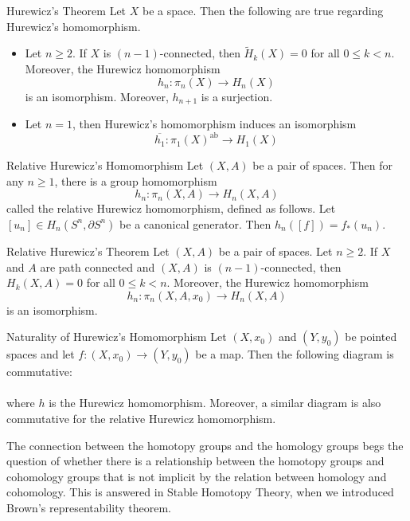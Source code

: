 \documentclass[a4paper]{article}
\begin{document}
\begin{thm}{Hurewicz's Theorem}{} Let $X$ be a space. Then the following are true regarding Hurewicz's homomorphism. 
\begin{itemize}
\item Let $n\geq 2$. If $X$ is $(n-1)$-connected, then $\widetilde{H}_k(X)=0$ for all $0\leq k<n$. Moreover, the Hurewicz homomorphism $$h_n:\pi_n(X)\to H_n(X)$$ is an isomorphism. Moreover, $h_{n+1}$ is a surjection. 
\item Let $n=1$, then Hurewicz's homomorphism induces an isomorphism $$\overline{h_1}:\pi_1(X)^\text{ab}\to H_1(X)$$ 
\end{itemize}
\end{thm}

\begin{thm}{Relative Hurewicz's Homomorphism}{} Let $(X,A)$ be a pair of spaces. Then for any $n\geq 1$, there is a group homomorphism $$h_n:\pi_n(X,A)\to H_n(X,A)$$ called the relative Hurewicz homomorphism, defined as follows. Let $[u_n]\in H_n(S^n,\partial S^n)$ be a canonical generator. Then $h_n([f])=f_\ast(u_n)$. 
\end{thm}

\begin{thm}{Relative Hurewicz's Theorem}{} Let $(X,A)$ be a pair of spaces. Let $n\geq 2$. If $X$ and $A$ are path connected and $(X,A)$ is $(n-1)$-connected, then $H_k(X,A)=0$ for all $0\leq k<n$. Moreover, the Hurewicz homomorphism $$h_n:\pi_n(X,A,x_0)\to H_n(X,A)$$ is an isomorphism. 
\end{thm}

\begin{thm}{Naturality of Hurewicz's Homomorphism}{} Let $(X,x_0)$ and $(Y,y_0)$ be pointed spaces and let $f:(X,x_0)\to(Y,y_0)$ be a map. Then the following diagram is commutative: \\
\\
where $h$ is the Hurewicz homomorphism. Moreover, a similar diagram is also commutative for the relative Hurewicz homomorphism. 
\end{thm}

The connection between the homotopy groups and the homology groups begs the question of whether there is a relationship between the homotopy groups and cohomology groups that is not implicit by the relation between homology and cohomology. This is answered in Stable Homotopy Theory, when we introduced Brown's representability theorem. 
\end{document}
